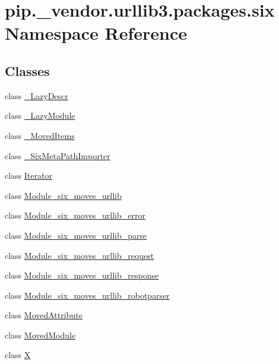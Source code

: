 \hypertarget{namespacepip_1_1__vendor_1_1urllib3_1_1packages_1_1six}{}\section{pip.\+\_\+vendor.\+urllib3.\+packages.\+six Namespace Reference}
\label{namespacepip_1_1__vendor_1_1urllib3_1_1packages_1_1six}
\subsection*{Classes}
\begin{DoxyCompactItemize}
\item 
class \hyperlink{classpip_1_1__vendor_1_1urllib3_1_1packages_1_1six_1_1__LazyDescr}{\+\_\+\+Lazy\+Descr}
\item 
class \hyperlink{classpip_1_1__vendor_1_1urllib3_1_1packages_1_1six_1_1__LazyModule}{\+\_\+\+Lazy\+Module}
\item 
class \hyperlink{classpip_1_1__vendor_1_1urllib3_1_1packages_1_1six_1_1__MovedItems}{\+\_\+\+Moved\+Items}
\item 
class \hyperlink{classpip_1_1__vendor_1_1urllib3_1_1packages_1_1six_1_1__SixMetaPathImporter}{\+\_\+\+Six\+Meta\+Path\+Importer}
\item 
class \hyperlink{classpip_1_1__vendor_1_1urllib3_1_1packages_1_1six_1_1Iterator}{Iterator}
\item 
class \hyperlink{classpip_1_1__vendor_1_1urllib3_1_1packages_1_1six_1_1Module__six__moves__urllib}{Module\+\_\+six\+\_\+moves\+\_\+urllib}
\item 
class \hyperlink{classpip_1_1__vendor_1_1urllib3_1_1packages_1_1six_1_1Module__six__moves__urllib__error}{Module\+\_\+six\+\_\+moves\+\_\+urllib\+\_\+error}
\item 
class \hyperlink{classpip_1_1__vendor_1_1urllib3_1_1packages_1_1six_1_1Module__six__moves__urllib__parse}{Module\+\_\+six\+\_\+moves\+\_\+urllib\+\_\+parse}
\item 
class \hyperlink{classpip_1_1__vendor_1_1urllib3_1_1packages_1_1six_1_1Module__six__moves__urllib__request}{Module\+\_\+six\+\_\+moves\+\_\+urllib\+\_\+request}
\item 
class \hyperlink{classpip_1_1__vendor_1_1urllib3_1_1packages_1_1six_1_1Module__six__moves__urllib__response}{Module\+\_\+six\+\_\+moves\+\_\+urllib\+\_\+response}
\item 
class \hyperlink{classpip_1_1__vendor_1_1urllib3_1_1packages_1_1six_1_1Module__six__moves__urllib__robotparser}{Module\+\_\+six\+\_\+moves\+\_\+urllib\+\_\+robotparser}
\item 
class \hyperlink{classpip_1_1__vendor_1_1urllib3_1_1packages_1_1six_1_1MovedAttribute}{Moved\+Attribute}
\item 
class \hyperlink{classpip_1_1__vendor_1_1urllib3_1_1packages_1_1six_1_1MovedModule}{Moved\+Module}
\item 
class \hyperlink{classpip_1_1__vendor_1_1urllib3_1_1packages_1_1six_1_1X}{X}
\end{DoxyCompactItemize}
